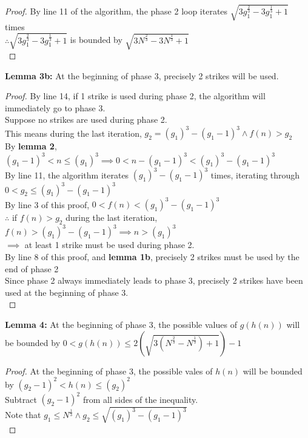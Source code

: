 \begin{problem}
\begin{proof}
    By line 11 of the algorithm, the phase 2 loop iterates $\sqrt{3g_1^{\frac{2}{3}} - 3g_1^{\frac{1}{3}} + 1}$ times \\
    $\therefore \sqrt{3g_1^{\frac{2}{3}} - 3g_1^{\frac{1}{3}} + 1}$ is bounded by $\sqrt{3N^{\frac{2}{3}} - 3N^{\frac{1}{3}} + 1}$ \\
  \end{proof}
  \textbf{Lemma 3b:} At the beginning of phase 3, precisely 2 strikes will be used. \\
  \begin{proof}
    By line 14, if 1 strike is used during phase 2, the algorithm will immediately go to phase 3. \\
    Suppose no strikes are used during phase 2. \\
    This means during the last iteration, $g_2 = (g_1)^3 - (g_1 - 1)^3 \land f(n) > g_2$ \\
    By \textbf{lemma 2}, $(g_1 - 1)^3 < n \leq (g_1)^3 \implies 0 < n - (g_1 - 1)^3 < (g_1)^3 - (g_1 - 1)^3$ \\
    By line 11, the algorithm iterates $(g_1)^3 - (g_1 - 1)^3$ times, iterating through $0 < g_2 \leq (g_1)^3 - (g_1 - 1)^3$ \\
    By line 3 of this proof, $0 < f(n) < (g_1)^3 - (g_1 - 1)^3$ \\
    $\therefore $ if $f(n) > g_2$ during the last iteration, $f(n) > (g_1)^3 - (g_1 - 1)^3 \implies n > (g_1)^3$ \\
    $\implies $ at least 1 strike must be used during phase 2. \\
    By line 8 of this proof, and \textbf{lemma 1b}, precisely 2 strikes must be used by the end of phase 2 \\
    Since phase 2 always immediately leads to phase 3, precisely 2 strikes have been used at the beginning of phase 3. \\
  \end{proof}
  \textbf{Lemma 4:} At the beginning of phase 3, the possible values of $g(h(n))$ will be bounded by $0 < g(h(n)) \leq 2(\sqrt{3(N^{\frac{2}{3}} - N^{\frac{1}{3}}) + 1}) - 1$ \\
  \begin{proof}
    At the beginning of phase 3, the possible vales of $h(n)$ will be bounded by $(g_2 - 1)^2 < h(n) \leq (g_2)^2$ \\
    Subtract $(g_2 - 1)^2$ from all sides of the inequality. \\
    Note that $g_1 \leq N^{\frac{1}{3}} \land g_2 \leq \sqrt{(g_1)^3 - (g_1 - 1)^3}$ \\

\end{proof}
\end{problem}
